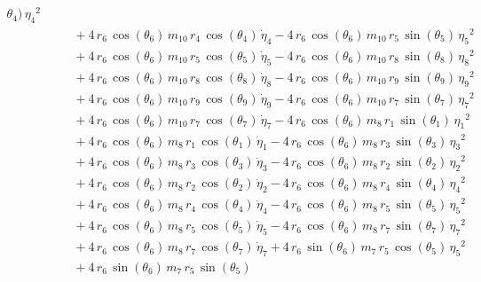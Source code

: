 \begin{eqnarray*}
{\theta_{4}})\,{{\eta_{4}}}^2 \\ &&\quad\mbox{} + 4\,r_{6}\,\cos({
\theta_{6}})\,m_{10}\,r_{4}\,\cos({\theta_{4}})\,{\dot{\eta}_{4}} - 4
\,r_{6}\,\cos({\theta_{6}})\,m_{10}\,r_{5}\,\sin({\theta_{5}})\,{{\eta
_{5}}}^2 \\ &&\quad\mbox{} + 4\,r_{6}\,\cos({\theta_{6}})\,m_{10}\,r_{
5}\,\cos({\theta_{5}})\,{\dot{\eta}_{5}} - 4\,r_{6}\,\cos({\theta_{6}}
)\,m_{10}\,r_{8}\,\sin({\theta_{8}})\,{{\eta_{8}}}^2 \\ &&\quad\mbox{}
 + 4\,r_{6}\,\cos({\theta_{6}})\,m_{10}\,r_{8}\,\cos({\theta_{8}})\,{
\dot{\eta}_{8}} - 4\,r_{6}\,\cos({\theta_{6}})\,m_{10}\,r_{9}\,\sin({
\theta_{9}})\,{{\eta_{9}}}^2 \\ &&\quad\mbox{} + 4\,r_{6}\,\cos({
\theta_{6}})\,m_{10}\,r_{9}\,\cos({\theta_{9}})\,{\dot{\eta}_{9}} - 4
\,r_{6}\,\cos({\theta_{6}})\,m_{10}\,r_{7}\,\sin({\theta_{7}})\,{{\eta
_{7}}}^2 \\ &&\quad\mbox{} + 4\,r_{6}\,\cos({\theta_{6}})\,m_{10}\,r_{
7}\,\cos({\theta_{7}})\,{\dot{\eta}_{7}} - 4\,r_{6}\,\cos({\theta_{6}}
)\,m_{8}\,r_{1}\,\sin({\theta_{1}})\,{{\eta_{1}}}^2 \\ &&\quad\mbox{}
 + 4\,r_{6}\,\cos({\theta_{6}})\,m_{8}\,r_{1}\,\cos({\theta_{1}})\,{
\dot{\eta}_{1}} - 4\,r_{6}\,\cos({\theta_{6}})\,m_{8}\,r_{3}\,\sin({
\theta_{3}})\,{{\eta_{3}}}^2 \\ &&\quad\mbox{} + 4\,r_{6}\,\cos({
\theta_{6}})\,m_{8}\,r_{3}\,\cos({\theta_{3}})\,{\dot{\eta}_{3}} - 4\,
r_{6}\,\cos({\theta_{6}})\,m_{8}\,r_{2}\,\sin({\theta_{2}})\,{{\eta_{2
}}}^2 \\ &&\quad\mbox{} + 4\,r_{6}\,\cos({\theta_{6}})\,m_{8}\,r_{2}\,
\cos({\theta_{2}})\,{\dot{\eta}_{2}} - 4\,r_{6}\,\cos({\theta_{6}})\,m
_{8}\,r_{4}\,\sin({\theta_{4}})\,{{\eta_{4}}}^2 \\ &&\quad\mbox{} + 4
\,r_{6}\,\cos({\theta_{6}})\,m_{8}\,r_{4}\,\cos({\theta_{4}})\,{
\dot{\eta}_{4}} - 4\,r_{6}\,\cos({\theta_{6}})\,m_{8}\,r_{5}\,\sin({
\theta_{5}})\,{{\eta_{5}}}^2 \\ &&\quad\mbox{} + 4\,r_{6}\,\cos({
\theta_{6}})\,m_{8}\,r_{5}\,\cos({\theta_{5}})\,{\dot{\eta}_{5}} - 4\,
r_{6}\,\cos({\theta_{6}})\,m_{8}\,r_{7}\,\sin({\theta_{7}})\,{{\eta_{7
}}}^2 \\ &&\quad\mbox{} + 4\,r_{6}\,\cos({\theta_{6}})\,m_{8}\,r_{7}\,
\cos({\theta_{7}})\,{\dot{\eta}_{7}} + 4\,r_{6}\,\sin({\theta_{6}})\,m
_{7}\,r_{5}\,\cos({\theta_{5}})\,{{\eta_{5}}}^2 \\ &&\quad\mbox{} + 4
\,r_{6}\,\sin({\theta_{6}})\,m_{7}\,r_{5}\,\sin({\theta_{5}})\,{
}
\end{eqnarray*}
